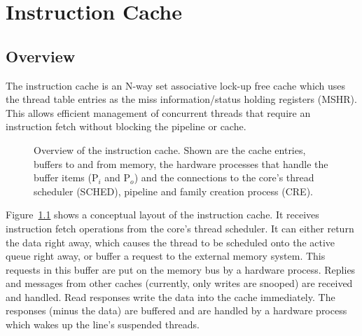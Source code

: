 \chapter{Instruction Cache}


\section{Overview}
The instruction cache is an N-way set associative lock-up free \cite{Kroft} cache which uses the thread table entries as the miss information/status holding registers (MSHR). This allows efficient management of concurrent threads that require an instruction fetch without blocking the pipeline or cache.

\begin{figure}
 \begin{center}
  
  \caption{Overview of the instruction cache. Shown are the cache entries, buffers to and from memory, the hardware processes that handle the buffer items (P$_i$ and P$_o$) and the connections to the core's thread scheduler (SCHED), pipeline and family creation process (CRE).}
  \label{fig:icache-overview}
 \end{center}
\end{figure}

Figure~\ref{fig:icache-overview} shows a conceptual layout of the instruction cache. It receives instruction fetch operations from the core's thread scheduler. It can either return the data right away, which causes the thread to be scheduled onto the active queue right away, or buffer a request to the external memory system. This requests in this buffer are put on the memory bus by a hardware process. Replies and messages from other caches (currently, only writes are snooped) are received and handled. Read responses write the data into the cache immediately. The responses (minus the data) are buffered and are handled by a hardware process which wakes up the line's suspended threads.

